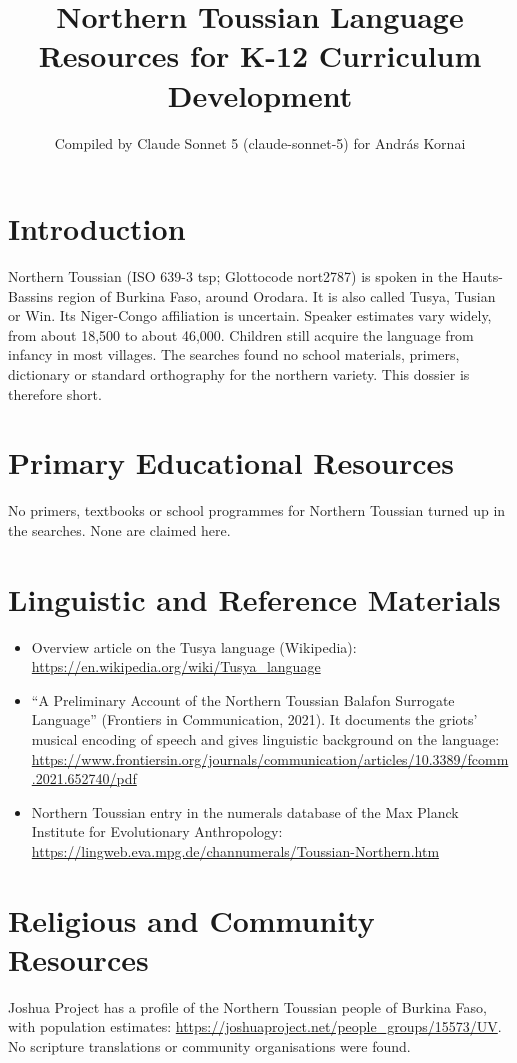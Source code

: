 \documentclass[12pt]{article}
\title{Northern Toussian Language Resources for K-12 Curriculum Development}
\author{Compiled by Claude Sonnet 5 (claude-sonnet-5) for Andr\'as Kornai}
\date{}
\begin{document}
\maketitle

\section{Introduction}
Northern Toussian (ISO 639-3 tsp; Glottocode nort2787) is spoken in the Hauts-Bassins region of Burkina Faso, around Orodara. It is also called Tusya, Tusian or Win. Its Niger-Congo affiliation is uncertain. Speaker estimates vary widely, from about 18,500 to about 46,000. Children still acquire the language from infancy in most villages. The searches found no school materials, primers, dictionary or standard orthography for the northern variety. This dossier is therefore short.

\section{Primary Educational Resources}
No primers, textbooks or school programmes for Northern Toussian turned up in the searches. None are claimed here.

\section{Linguistic and Reference Materials}
\begin{itemize}
\item Overview article on the Tusya language (Wikipedia): \url{https://en.wikipedia.org/wiki/Tusya_language}
\item ``A Preliminary Account of the Northern Toussian Balafon Surrogate Language'' (Frontiers in Communication, 2021). It documents the griots' musical encoding of speech and gives linguistic background on the language: \url{https://www.frontiersin.org/journals/communication/articles/10.3389/fcomm.2021.652740/pdf}
\item Northern Toussian entry in the numerals database of the Max Planck Institute for Evolutionary Anthropology: \url{https://lingweb.eva.mpg.de/channumerals/Toussian-Northern.htm}
\end{itemize}

\section{Religious and Community Resources}
Joshua Project has a profile of the Northern Toussian people of Burkina Faso, with population estimates: \url{https://joshuaproject.net/people_groups/15573/UV}. No scripture translations or community organisations were found.
\end{document}
